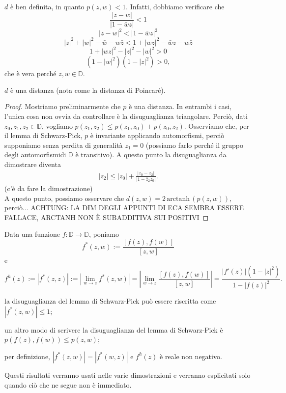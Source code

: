 $d$ è ben definita, in quanto $p(z,w)<1$. Infatti, dobbiamo verificare che
  $$\frac{|z-w|}{|1-\bar{w}z|} < 1$$
  $$|z-w|^2 < |1-\bar{w}z|^2$$
  $$|z|^2+|w|^2-\bar{w}-w\bar{z} < 1+|wz|^2-\bar{w}z-w\bar{z}$$
  $$1+|wz|^2-|z|^2-|w|^2 > 0$$
  $$(1-|w|^2)(1-|z|^2) > 0,$$
che è vera perché $z, w \in \mathbb{D}$.

\begin{prop}
  $d$ è una distanza (nota come la distanza di Poincaré).
\end{prop}

\begin{proof}
  Mostriamo preliminarmente che $p$ è una distanza. In entrambi i casi, l'unica cosa non ovvia da controllare è la disuguaglianza triangolare. Perciò, dati $z_0, z_1, z_2 \in \mathbb{D}$, vogliamo $p(z_1,z_2) \le p(z_1,z_0)+p(z_0,z_2)$. Osserviamo che, per il lemma di Schwarz-Pick, $p$ è invariante applicando automorfismi, perciò supponiamo senza perdita di generalità $z_1=0$ (possiamo farlo perché il gruppo degli automorfismidi $\mathbb{D}$ è transitivo). A questo punto la disuguaglianza da dimostrare diventa
  \begin{align*}
    |z_2| \le |z_0|+\frac{|z_0-z_2|}{|1-\bar{z}_2z_0|}.
  \end{align*}
  (c'è da fare la dimostrazione) \\
  A questo punto, possiamo osservare che $d(z,w) =2\,\text{arctanh}\,(p(z,w))$, perciò... ACHTUNG: LA DIM DEGLI APPUNTI DI ECA SEMBRA ESSERE FALLACE, ARCTANH NON È SUBADDITIVA SUI POSITIVI
\end{proof}

\begin{defn}
  Data una funzione $f: \mathbb{D} \longrightarrow \mathbb{D}$, poniamo
  $$f^*(z,w):=\frac{[f(z),f(w)]}{[z,w]}$$
  e
  $$f^h(z):=|f^*(z,z)|:=\left|\lim_{w \longrightarrow z} f^*(z,w)\right|=\left|\lim_{w \longrightarrow z} \frac{[f(z),f(w)]}{[z,w]}\right|=\frac{|f'(z)|(1-|z|^2)}{1-|f(z)|^2}.$$
\end{defn}

\begin{oss}
  \begin{nlist}
    \item la disuguaglianza del lemma di Schwarz-Pick può essere riscritta come $|f^*(z,w)| \le 1$;
    \item  un altro modo di scrivere la disuguaglianza del lemma di Schwarz-Pick è $p(f(z),f(w)) \le p(z,w)$;
    \item per definizione, $|f^*(z,w)|=|f^*(w,z)|$ e $f^h(z)$ è reale non negativo.
  \end{nlist}
  Questi risultati verranno usati nelle varie dimostrazioni e verranno esplicitati solo quando ciò che ne segue non è immediato.
\end{oss}
